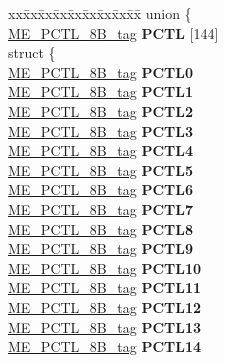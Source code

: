 \begin{DoxyCompactItemize}
\begin{tabbing}
\end{tabbing}\item 
\mbox{\label{structME__struct__tag_a50052746f8df5d231947e55bc1d00bb5}} 
\begin{tabbing}
xx\=xx\=xx\=xx\=xx\=xx\=xx\=xx\=xx\=\kill
union \{\\
\>\mbox{\hyperlink{unionME__PCTL__8B__tag}{ME\_PCTL\_8B\_tag}} {\bfseries PCTL} \mbox{[}144\mbox{]}\\
\mbox{\label{unionME__struct__tag_1_1_0D1641_a75a4d6f62bc727301bf0965da52a53f9}} 
\>struct \{\\
\>\>\mbox{\hyperlink{unionME__PCTL__8B__tag}{ME\_PCTL\_8B\_tag}} {\bfseries PCTL0}\\
\>\>\mbox{\hyperlink{unionME__PCTL__8B__tag}{ME\_PCTL\_8B\_tag}} {\bfseries PCTL1}\\
\>\>\mbox{\hyperlink{unionME__PCTL__8B__tag}{ME\_PCTL\_8B\_tag}} {\bfseries PCTL2}\\
\>\>\mbox{\hyperlink{unionME__PCTL__8B__tag}{ME\_PCTL\_8B\_tag}} {\bfseries PCTL3}\\
\>\>\mbox{\hyperlink{unionME__PCTL__8B__tag}{ME\_PCTL\_8B\_tag}} {\bfseries PCTL4}\\
\>\>\mbox{\hyperlink{unionME__PCTL__8B__tag}{ME\_PCTL\_8B\_tag}} {\bfseries PCTL5}\\
\>\>\mbox{\hyperlink{unionME__PCTL__8B__tag}{ME\_PCTL\_8B\_tag}} {\bfseries PCTL6}\\
\>\>\mbox{\hyperlink{unionME__PCTL__8B__tag}{ME\_PCTL\_8B\_tag}} {\bfseries PCTL7}\\
\>\>\mbox{\hyperlink{unionME__PCTL__8B__tag}{ME\_PCTL\_8B\_tag}} {\bfseries PCTL8}\\
\>\>\mbox{\hyperlink{unionME__PCTL__8B__tag}{ME\_PCTL\_8B\_tag}} {\bfseries PCTL9}\\
\>\>\mbox{\hyperlink{unionME__PCTL__8B__tag}{ME\_PCTL\_8B\_tag}} {\bfseries PCTL10}\\
\>\>\mbox{\hyperlink{unionME__PCTL__8B__tag}{ME\_PCTL\_8B\_tag}} {\bfseries PCTL11}\\
\>\>\mbox{\hyperlink{unionME__PCTL__8B__tag}{ME\_PCTL\_8B\_tag}} {\bfseries PCTL12}\\
\>\>\mbox{\hyperlink{unionME__PCTL__8B__tag}{ME\_PCTL\_8B\_tag}} {\bfseries PCTL13}\\
\>\>\mbox{\hyperlink{unionME__PCTL__8B__tag}{ME\_PCTL\_8B\_tag}} {\bfseries PCTL14}\\

\end{tabbing}
\end{DoxyCompactItemize}
